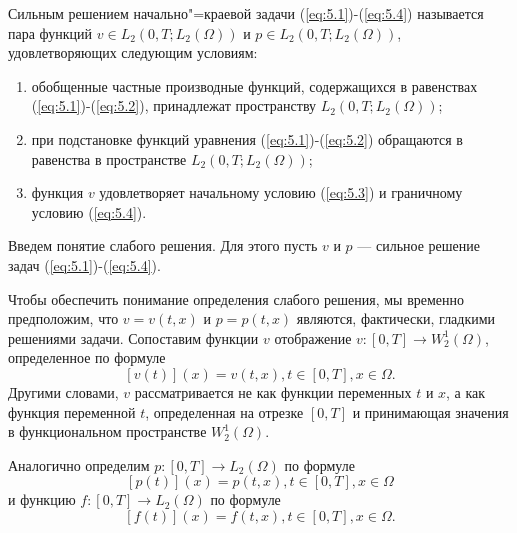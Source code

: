 \begin{definition}
    Сильным решением начально"=краевой задачи (\ref{eq:5.1})-(\ref{eq:5.4}) называется пара функций $v\in L_2(0, T; L_2(\Omega))$ и
    $p\in L_2(0, T; L_2(\Omega))$, удовлетворяющих следующим условиям:
\end{definition}

\begin{enumerate} 
    \item обобщенные частные производные функций, содержащихся в равенствах (\ref{eq:5.1})-(\ref{eq:5.2}), принадлежат пространству $L_2(0, T; L_2(\Omega))$;
    \item при подстановке функций уравнения (\ref{eq:5.1})-(\ref{eq:5.2}) обращаются в равенства в пространстве $L_2(0, T; L_2(\Omega))$;
    \item функция $v$ удовлетворяет начальному условию (\ref{eq:5.3}) и граничному условию (\ref{eq:5.4}).
\end{enumerate}

Введем понятие слабого решения. Для этого пусть $v$ и $p$ --- сильное решение задач (\ref{eq:5.1})-(\ref{eq:5.4}).

Чтобы обеспечить понимание определения слабого решения, мы временно предположим, что $v=v(t, x)$ и $p=p(t, x)$ являются, фактически, гладкими решениями задачи.
Сопоставим функции $v$ отображение $v:[0, T]\rightarrow W^1_2(\Omega)$, определенное по формуле $$[v(t)](x)=v(t, x), t\in[0, T], x\in\Omega.$$
Другими словами, $v$ рассматривается не как функции переменных $t$ и $x$, а как функция переменной $t$, определенная на отрезке
$[0, T]$ и принимающая значения в функциональном пространстве $W^1_2(\Omega)$.

Аналогично определим $p:[0, T]\rightarrow L_2(\Omega)$ по формуле $$[p(t)](x)=p(t, x), t\in[0, T], x\in\Omega$$
и функцию $f:[0, T]\rightarrow L_2(\Omega)$ по формуле $$[f(t)](x)=f(t, x), t\in[0, T], x\in\Omega.$$\\

